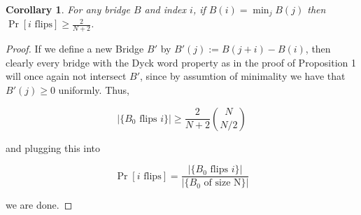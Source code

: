 \documentclass{article}
\newtheorem{corollary}{Corollary}
\theoremstyle{definition}
\begin{document}
\begin{corollary} For any bridge $B$ and index $i$, if $B(i)=\min_jB(j)$ then $\Pr[i \mathrm{\,\, flips}]\geq \frac{2}{N+2}$.
\end{corollary}
\begin{proof} If we define a new Bridge $B'$ by $B'(j):=B(j+i)-B(i)$, then clearly every bridge with the Dyck word property as in the proof of Proposition 1 will once again not intersect $B'$, since by assumtion of minimality we have that $B'(j)\geq0$ uniformly. Thus,

$$|\{B_0 \,\, \mathrm{flips\,\, }i\}|\geq \frac{2}{N+2}{N\choose N/2}$$

and plugging this into

$$\Pr[i\,\,\mathrm{flips}]=\frac{|\{B_0 \,\, \mathrm{flips\,\, }i\}|}{|\{B_0\,\,\mathrm{of\,\,size\,\,N}\}|}$$

we are done.
\end{proof}


\end{document}
